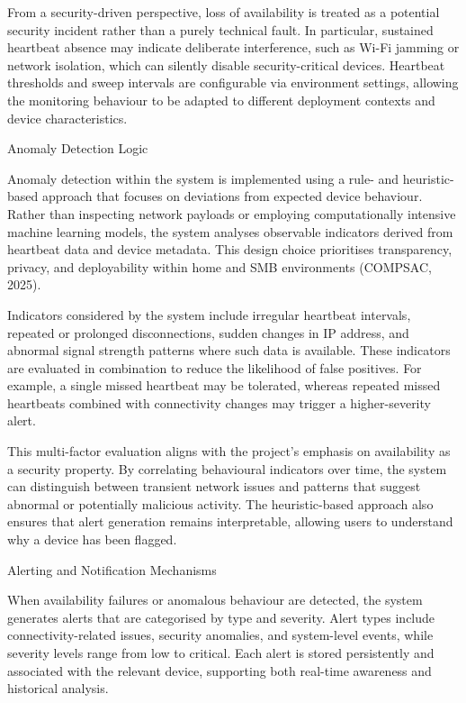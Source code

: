 From a security-driven perspective, loss of availability is treated as a potential security incident rather than a purely technical fault. In particular, sustained heartbeat absence may indicate deliberate interference, such as Wi-Fi jamming or network isolation, which can silently disable security-critical devices. Heartbeat thresholds and sweep intervals are configurable via environment settings, allowing the monitoring behaviour to be adapted to different deployment contexts and device characteristics.

Anomaly Detection Logic

Anomaly detection within the system is implemented using a rule- and heuristic-based approach that focuses on deviations from expected device behaviour. Rather than inspecting network payloads or employing computationally intensive machine learning models, the system analyses observable indicators derived from heartbeat data and device metadata. This design choice prioritises transparency, privacy, and deployability within home and SMB environments (COMPSAC, 2025).

Indicators considered by the system include irregular heartbeat intervals, repeated or prolonged disconnections, sudden changes in IP address, and abnormal signal strength patterns where such data is available. These indicators are evaluated in combination to reduce the likelihood of false positives. For example, a single missed heartbeat may be tolerated, whereas repeated missed heartbeats combined with connectivity changes may trigger a higher-severity alert.

This multi-factor evaluation aligns with the project's emphasis on availability as a security property. By correlating behavioural indicators over time, the system can distinguish between transient network issues and patterns that suggest abnormal or potentially malicious activity. The heuristic-based approach also ensures that alert generation remains interpretable, allowing users to understand why a device has been flagged.

Alerting and Notification Mechanisms

When availability failures or anomalous behaviour are detected, the system generates alerts that are categorised by type and severity. Alert types include connectivity-related issues, security anomalies, and system-level events, while severity levels range from low to critical. Each alert is stored persistently and associated with the relevant device, supporting both real-time awareness and historical analysis.

